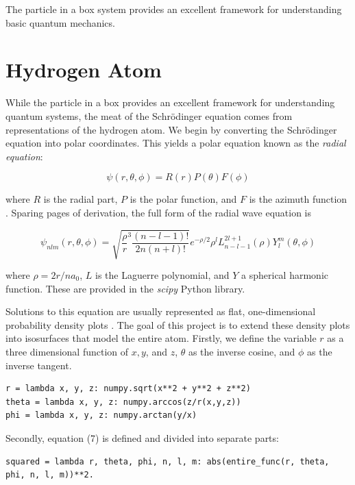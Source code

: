 \documentclass[11pt]{article}
\begin{document}
The particle in a box system provides an excellent framework for understanding basic quantum mechanics. 

\newpage

\section{Hydrogen Atom}
While the particle in a box provides an excellent framework for understanding quantum systems, the meat of the Schrödinger equation comes from representations of the hydrogen atom. We begin by converting the Schrödinger equation into polar coordinates. This yields a polar equation known as the \textit{radial equation}:

\begin{equation}
\psi(r, \theta, \phi) = R(r)P(\theta)F(\phi)
\end{equation}

\noindent where $R$ is the radial part, $P$ is the polar function, and $F$ is the azimuth function \cite{quantum}. Sparing pages of derivation, the full form of the radial wave equation is

\begin{equation}
\psi_{nlm}(r,\theta,\phi) = \sqrt{\frac{\rho}{r}^3 \frac{(n-l-1)!}{2n(n+l)!}}e^{-\rho / 2}\rho^l L^{2l+1}_{n-l-1}(\rho)Y^{m}_{l}(\theta, \phi)
\end{equation}

\noindent where $\rho = 2r / na_0$, $L$ is the Laguerre polynomial, and $Y$ a spherical harmonic function. These are provided in the \textit{scipy} Python library. 

Solutions to this equation are usually represented as flat, one-dimensional probability density plots \cite{quantum}. The goal of this project is to extend these density plots into isosurfaces that model the entire atom. Firstly, we define the variable $r$ as a three dimensional function of $x, y$, and $z$, $\theta$ as the inverse cosine, and $\phi$ as the inverse tangent.

\begin{verbatim}
r = lambda x, y, z: numpy.sqrt(x**2 + y**2 + z**2)
theta = lambda x, y, z: numpy.arccos(z/r(x,y,z))
phi = lambda x, y, z: numpy.arctan(y/x)
\end{verbatim}

\noindent Secondly, equation (7) is defined and divided into separate parts:

\begin{verbatim}
squared = lambda r, theta, phi, n, l, m: abs(entire_func(r, theta, phi, n, l, m))**2.
\end{verbatim}
\end{document}
